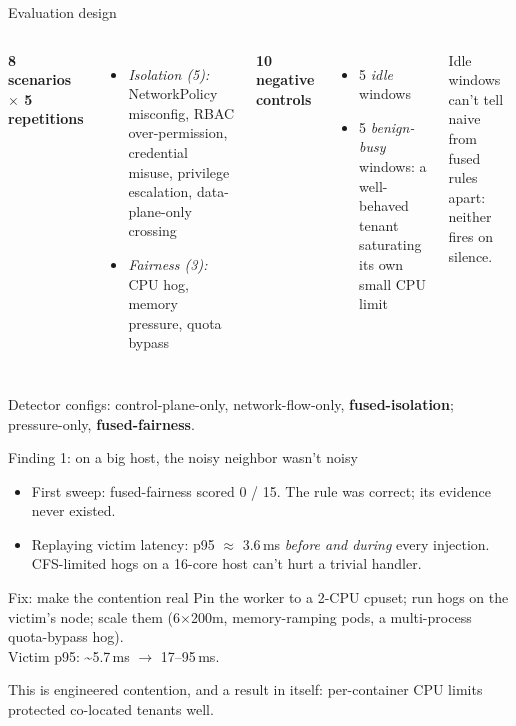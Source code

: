 \documentclass[aspectratio=169,11pt]{beamer}
\begin{document}
\begin{frame}{Evaluation design}
\begin{columns}[T]
\textbf{8 scenarios $\times$ 5 repetitions}
\begin{itemize}
\item \emph{Isolation (5):} NetworkPolicy misconfig, RBAC over-permission, credential misuse, privilege escalation, data-plane-only crossing
\item \emph{Fairness (3):} CPU hog, memory pressure, quota bypass
\end{itemize}
\textbf{10 negative controls}
\begin{itemize}
\item 5 \emph{idle} windows
\item 5 \emph{benign-busy} windows: a well-behaved tenant saturating its own small CPU limit
\end{itemize}
\vspace{2mm}
\small Idle windows can't tell naive from fused rules apart: neither fires on silence.
\end{columns}
\vspace{3mm}
Detector configs: control-plane-only, network-flow-only, \textbf{fused-isolation}; pressure-only, \textbf{fused-fairness}.
\end{frame}

\begin{frame}{Finding 1: on a big host, the noisy neighbor wasn't noisy}
\begin{itemize}
\item First sweep: fused-fairness scored \alert{0 / 15}. The rule was correct; its evidence never existed.
\item Replaying victim latency: p95 $\approx$ 3.6\,ms \emph{before and during} every injection. CFS-limited hogs on a 16-core host can't hurt a trivial handler.
\end{itemize}
\vspace{2mm}
\begin{block}{Fix: make the contention real}
Pin the worker to a 2-CPU cpuset; run hogs on the victim's node; scale them (6$\times$200m, memory-ramping pods, a multi-process quota-bypass hog).\\
Victim p95: \textasciitilde 5.7\,ms $\to$ 17--95\,ms.
\end{block}
\small This is engineered contention, and a result in itself: per-container CPU limits protected co-located tenants well.
\end{frame}
\end{document}

